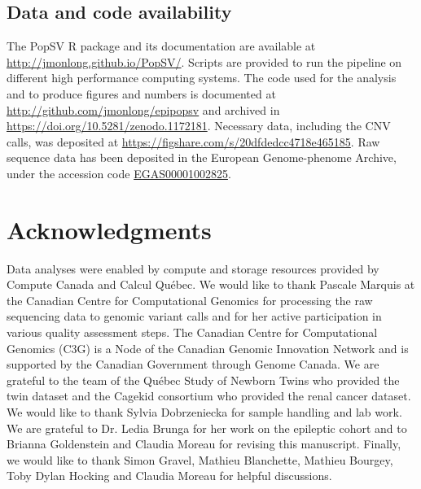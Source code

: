 \subsection*{Data and code availability}
\label{sec:code}

The {\sf PopSV} R package and its documentation are available at \url{http://jmonlong.github.io/PopSV/}.
Scripts are provided to run the pipeline on different high performance computing systems.
The code used for the analysis and to produce figures and numbers is documented at \url{http://github.com/jmonlong/epipopsv} and archived in \url{https://doi.org/10.5281/zenodo.1172181}.
Necessary data, including the CNV calls, was deposited at \url{https://figshare.com/s/20dfdedcc4718e465185}.
Raw sequence data has been deposited in the European Genome-phenome Archive, under the accession code \href{https://www.ebi.ac.uk/ega/studies/EGAS00001002825}{EGAS00001002825}.

\section{Acknowledgments}
Data analyses were enabled by compute and storage resources provided by Compute Canada and Calcul Qu\'ebec.
We would like to thank Pascale Marquis at the Canadian Centre for Computational Genomics for processing the raw sequencing data to genomic variant calls and for her active participation in various quality assessment steps.
The Canadian Centre for Computational Genomics (C3G) is a Node of the Canadian Genomic Innovation Network and is supported by the Canadian Government through Genome Canada.
We are grateful to the team of the Qu\'ebec Study of Newborn Twins who provided the twin dataset and the Cagekid consortium who provided the renal cancer dataset.
We would like to thank Sylvia Dobrzeniecka for sample handling and lab work.
We are grateful to Dr. Ledia Brunga for her work on the epileptic cohort and to Brianna Goldenstein and Claudia Moreau for revising this manuscript.
Finally, we would like to thank Simon Gravel, Mathieu Blanchette, Mathieu Bourgey, Toby Dylan Hocking and Claudia Moreau for helpful discussions.


